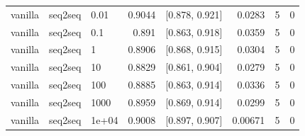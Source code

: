 \documentclass[10pt]{article}
\begin{document}
{\begin{longtable}{lllrlrrr}
vanilla & seq2seq & 0.01 & 0.9044 & [0.878, 0.921] & 0.0283 & 5 & 0\\
vanilla & seq2seq & 0.1 & 0.891 & [0.863, 0.918] & 0.0359 & 5 & 0\\
vanilla & seq2seq & 1 & 0.8906 & [0.868, 0.915] & 0.0304 & 5 & 0\\
vanilla & seq2seq & 10 & 0.8829 & [0.861, 0.904] & 0.0279 & 5 & 0\\
vanilla & seq2seq & 100 & 0.8885 & [0.863, 0.914] & 0.0336 & 5 & 0\\
vanilla & seq2seq & 1000 & 0.8959 & [0.869, 0.914] & 0.0299 & 5 & 0\\
vanilla & seq2seq & 1e+04 & 0.9008 & [0.897, 0.907] & 0.00671 & 5 & 0\\
\bottomrule
\end{longtable}
}
\end{document}
